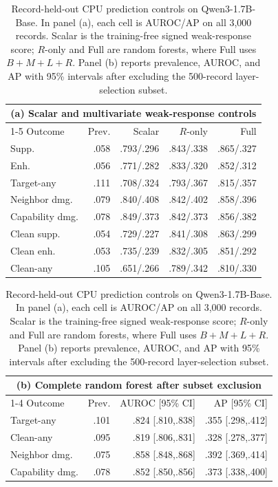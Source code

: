 \begin{table}[t]
\centering
\small
\setlength{\tabcolsep}{1.0pt}
\caption{Record-held-out CPU prediction controls on Qwen3-1.7B-Base. In
panel (a), each cell is AUROC/AP on all 3,000 records. Scalar is the
training-free signed weak-response score; $R$-only and Full are random forests,
where Full uses $B+M+L+R$. Panel (b) reports prevalence, AUROC, and AP with
95\% intervals after excluding the 500-record layer-selection subset.}
\label{tab:cpu-prediction-controls}
\begin{tabular*}{\columnwidth}{@{\extracolsep{\fill}}lrrrr@{}}
\toprule
\multicolumn{5}{c}{(a) Scalar and multivariate weak-response controls} \\
\cmidrule(lr){1-5}
Outcome & Prev. & Scalar & $R$-only & Full \\
\midrule
Supp. & .058 & .793/.296 & .843/.338 & .865/.327 \\
Enh. & .056 & .771/.282 & .833/.320 & .852/.312 \\
Target-any & .111 & .708/.324 & .793/.367 & .815/.357 \\
Neighbor dmg. & .079 & .840/.408 & .842/.402 & .858/.396 \\
Capability dmg. & .078 & .849/.373 & .842/.373 & .856/.382 \\
Clean supp. & .054 & .729/.227 & .841/.308 & .863/.299 \\
Clean enh. & .053 & .735/.239 & .832/.305 & .851/.292 \\
Clean-any & .105 & .651/.266 & .789/.342 & .810/.330 \\
\bottomrule
\end{tabular*}

\begin{tabular*}{\columnwidth}{@{\extracolsep{\fill}}lrrr@{}}
\toprule
\multicolumn{4}{c}{(b) Complete random forest after subset exclusion} \\
\cmidrule(lr){1-4}
Outcome & Prev. & AUROC [95\% CI] & AP [95\% CI] \\
\midrule
Target-any & .101 & .824 [.810,.838] & .355 [.298,.412] \\
Clean-any & .095 & .819 [.806,.831] & .328 [.278,.377] \\
Neighbor dmg. & .075 & .858 [.848,.868] & .392 [.369,.414] \\
Capability dmg. & .078 & .852 [.850,.856] & .373 [.338,.400] \\
\bottomrule
\end{tabular*}

\end{table}
